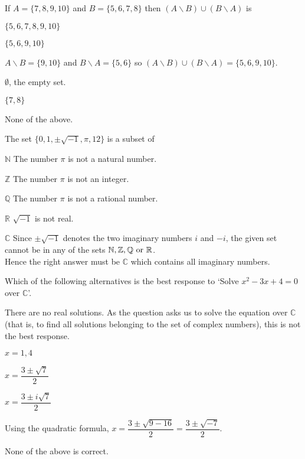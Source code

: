 \documentclass[pst2pdf]{webquiz}
\begin{document}
\begin{question}
If $A=\{7,8,9,10\}$ and $B=\{5,6,7,8\}$ then $(A\backslash
B)\cup(B\backslash A)$ is
\begin{choice}
\incorrect $\{5,6,7,8,9,10\}$

\correct $\{5,6,9,10\}$

\response $A\backslash B=\{9,10\}$ and $B\backslash A=\{5,6\}$ so
$(A\backslash B)\cup(B\backslash A)=\{5,6,9,10\}$.

\incorrect $\emptyset$, the empty set.

\incorrect $\{7,8\}$

\incorrect None of the above.

\end{choice}
\end{question}

\begin{question}
The set \(\{0,1,\pm\sqrt{-1},\pi,12\}\) is a subset of
\begin{choice}
\incorrect $\mathbb N$
\response The number \(\pi\) is not a natural number.

\incorrect $\mathbb Z$
\response The number \(\pi\) is not an integer.

\incorrect $\mathbb Q$
\response The number \(\pi\) is not a rational number.

\incorrect $\mathbb R$
\response \(\sqrt{-1}\) is not real.

\correct $\mathbb C$
\response Since \(\pm\sqrt{-1}\)  denotes the two imaginary numbers  $i$ and $-i$, the given set cannot be
in any of the sets $\mathbb{N,Z,Q}\ \rm{or}\ \mathbb{R}$.  \\
Hence the
right answer must be ${\mathbb C}$ which contains all imaginary
numbers.

\end{choice}
\end{question}

\begin{question}
Which of the following alternatives is the best response to `Solve
$x^{2}-3x+4=0$ over $\mathbb{C}$'.
\begin{choice}
\incorrect There are no real solutions.
\response As the question asks us to solve the equation over $\mathbb C$ (that is, to find all solutions belonging to the set of complex numbers), this is not the best response.

\incorrect $x=1,4$

\incorrect \(x=\dfrac{3\pm\sqrt{7}}{2}\)

\correct  \(x=\dfrac{3\pm i\sqrt{7}}{2}\)

\response Using the quadratic formula,
\(x =\dfrac{3\pm\sqrt{9-16}}{2} = \dfrac{3\pm\sqrt{-7}}{2}\).


\incorrect None of the above is correct.
\end{choice}
\end{question}
\end{document}
